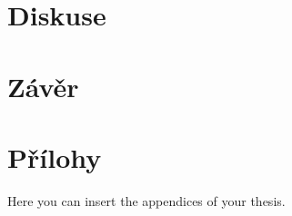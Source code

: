 \documentclass[
  digital,     %
  twoside,     %
  lof,         %
  lot,         %
]{fithesis4}
\begin{document}
\chapter{Diskuse}
\chapter{Závěr}

\printbibliography[heading=bibintoc] %

  \makeatletter\thesis@blocks@clear\makeatother
  \printindex

\appendix %
\chapter{Přílohy}
Here you can insert the appendices of your thesis.
\end{document}
